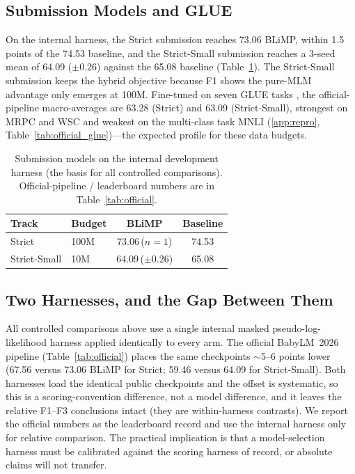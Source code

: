 \documentclass[11pt]{article}
\begin{document}
\subsection{Submission Models and GLUE}
On the internal harness, the Strict submission reaches 73.06 BLiMP, within 1.5 points of the 74.53 baseline, and the Strict-Small submission reaches a 3-seed mean of 64.09 ($\pm$0.26) against the 65.08 baseline (Table~\ref{tab:headline}). The Strict-Small submission keeps the hybrid objective because F1 shows the pure-MLM advantage only emerges at 100M. Fine-tuned on seven GLUE tasks \cite{Wang2019GLUE}, the official-pipeline macro-averages are 63.28 (Strict) and 63.09 (Strict-Small), strongest on MRPC and WSC and weakest on the multi-class task MNLI (\ref{app:repro}, Table~\ref{tab:official_glue})---the expected profile for these data budgets.

\begin{table}[t]
\centering\small
\caption{Submission models on the internal development harness (the basis for all controlled comparisons). Official-pipeline / leaderboard numbers are in Table~\ref{tab:official}.}
\label{tab:headline}
\begin{tabular}{llcc}
\toprule
Track & Budget & BLiMP & Baseline \\
\midrule
Strict & 100M & 73.06\,($n{=}1$) & 74.53 \\
Strict-Small & 10M & 64.09\,($\pm$0.26) & 65.08 \\
\bottomrule
\end{tabular}
\end{table}

\subsection{Two Harnesses, and the Gap Between Them}
\label{subsec:harness}
All controlled comparisons above use a single internal masked pseudo-log-likelihood harness applied identically to every arm. The official BabyLM~2026 pipeline (Table~\ref{tab:official}) places the same checkpoints $\sim$5--6 points lower (67.56 versus 73.06 BLiMP for Strict; 59.46 versus 64.09 for Strict-Small). Both harnesses load the identical public checkpoints and the offset is systematic, so this is a scoring-convention difference, not a model difference, and it leaves the relative F1--F3 conclusions intact (they are within-harness contrasts). We report the official numbers as the leaderboard record and use the internal harness only for relative comparison. The practical implication is that a model-selection harness must be calibrated against the scoring harness of record, or absolute claims will not transfer.
\end{document}
